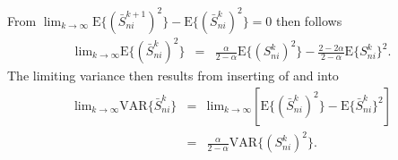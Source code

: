 From $\lim_{k\rightarrow\infty}\text{E}\{(\bar{S}_{ni}^{k+1})^{2}\}-\text{E}\{(\bar{S}_{ni}^{k})^{2}\}=0$
then follows
\begin{eqnarray}
\text{lim}_{k\rightarrow\infty}\text{E}\{(\bar{S}_{ni}^{k})^{2}\} 
& = & 
\frac{\alpha}{2-\alpha}\text{E}\{(S_{ni}^{k})^{2}\}-\frac{2-2\alpha}{2-\alpha}\text{E}\{S_{ni}^{k}\}^{2}. \label{eq:second-score-moment}
\end{eqnarray}
%
The limiting variance then results from inserting of  and  into
\begin{eqnarray}
\text{lim}_{k\rightarrow\infty}\text{VAR}\{\bar{S}_{ni}^{k}\} 
& = & \text{lim}_{k\rightarrow\infty}\left[\text{E}\{(\bar{S}_{ni}^{k})^{2}\}-\text{E}\{\bar{S}_{ni}^{k}\}^{2}\right]\\
 & = & \frac{\alpha}{2-\alpha}\text{VAR}\{(S_{ni}^{k})^{2}\}.
\end{eqnarray}
